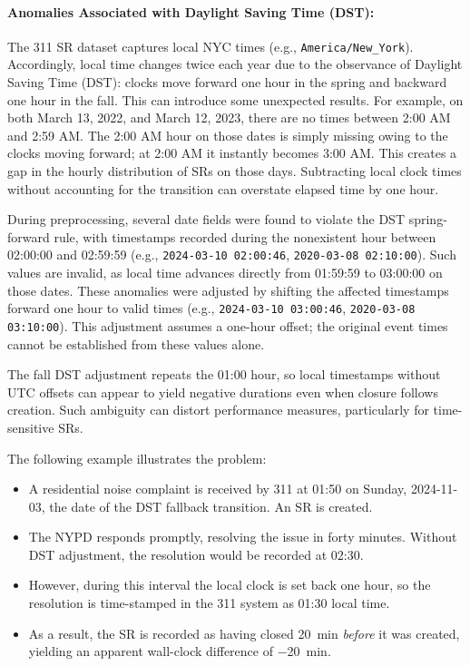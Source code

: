 \documentclass[linenumber]{jdsart}
\begin{document}
\paragraph{Anomalies Associated with Daylight Saving Time (DST):}
\label{par:dstsystemic}
 The 311 SR dataset captures local NYC times 
 (e.g., \texttt{America/New\_York}). 
Accordingly, local time changes twice each year due to the observance
of Daylight Saving Time (DST): clocks move forward one hour in the
spring and backward one hour in the fall. This can introduce 
some unexpected results. For example, 
on both March 13, 2022, and March 12, 2023, there are no times 
between 2:00 AM and 2:59 AM. The 2:00 AM hour on those dates
is simply missing owing to the clocks moving forward; at 2:00 AM 
it instantly becomes 3:00 AM. This creates a gap in the hourly 
distribution of SRs on those days. Subtracting local clock times without
accounting for the transition can overstate elapsed time by one hour.

During preprocessing, several date fields were found to violate the DST
spring-forward rule, with timestamps recorded during the nonexistent hour
between 02:00:00 and 02:59:59
(e.g., \texttt{2024-03-10 02:00:46},
\texttt{2020-03-08 02:10:00}). Such values are invalid, as local time
advances directly from 01:59:59 to 03:00:00 on those dates. These anomalies
were adjusted by shifting the affected timestamps forward one hour
to valid times (e.g., \texttt{2024-03-10 03:00:46},
\texttt{2020-03-08 03:10:00}). This adjustment assumes a one-hour
offset; the original event times cannot be established from these
values alone.

The fall DST adjustment repeats the 01:00 hour, so local timestamps
without UTC offsets can appear to yield negative durations even when
closure follows creation. Such ambiguity can distort performance
measures, particularly for time-sensitive SRs.

The following example illustrates the problem:


\begin{itemize}[left=1.5em, itemsep=0.25\baselineskip]
  \item A residential noise complaint is received by 311 at 01{:}50 on Sunday,
  2024-11-03, the date of the DST fallback transition. An SR is created.

  \item The NYPD responds promptly, resolving the issue in forty minutes. 
  Without DST adjustment, the resolution would be recorded at
  02{:}30.

  \item However, during this interval the local clock is set back one hour, 
  so the resolution is time-stamped in the 311 system as 01{:}30 local time. 

  \item As a result, the SR is recorded as having closed
\SI{20}{\minute} \emph{before} it was created, yielding an apparent wall-clock difference of
\SI{-20}{\minute}.

\end{itemize}
\end{document}

